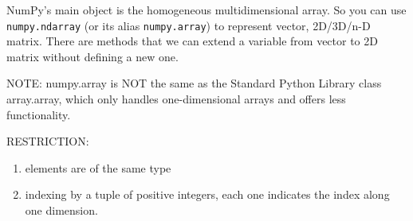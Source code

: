 NumPy’s main object is the homogeneous multidimensional array.
So you can use \verb!numpy.ndarray! (or its alias \verb!numpy.array!) to
represent vector, 2D/3D/n-D matrix.
There are methods that we can extend a variable from vector to 2D matrix without
defining a new one.

NOTE: numpy.array is NOT the same as the Standard Python Library class
array.array, which only handles one-dimensional arrays and offers less
functionality.


RESTRICTION:
\begin{enumerate}
  \item elements are of the same type

  \item indexing by a tuple of positive integers, each one indicates the index along one dimension.  
\end{enumerate}

